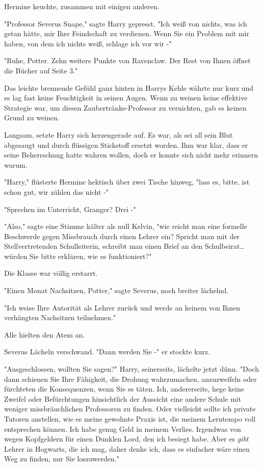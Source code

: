 {Hermine keuchte, zusammen mit einigen anderen.

"Professor Severus Snape," sagte Harry gepresst. "Ich weiß von nichts, was ich getan hätte, mir Ihre Feindschaft zu verdienen. Wenn Sie ein Problem mit mir haben, von dem ich nichts weiß, schlage ich vor wir -"

"Ruhe, Potter. Zehn weitere Punkte von Ravenclaw. Der Rest von Ihnen öffnet die Bücher auf Seite 3."

Das leichte brennende Gefühl ganz hinten in Harrys Kehle währte nur kurz und es lag fast keine Feuchtigkeit in seinen Augen. Wenn zu weinen keine effektive Strategie war, um diesen Zaubertränke-Professor zu vernichten, gab es keinen Grund zu weinen.

Langsam, setzte Harry sich kerzengerade auf. Es war, als sei all sein Blut abgesaugt und durch flüssigen Stickstoff ersetzt worden. Ihm war klar, dass er seine Beherrschung hatte wahren wollen, doch er konnte sich nicht mehr erinnern warum.

"Harry," flüsterte Hermine hektisch über zwei Tische hinweg, "lass es, bitte, ist schon gut, wir zählen das nicht -"

"Sprechen im Unterricht, Granger? Drei -"

"Also," sagte eine Stimme kälter als null Kelvin, "wie reicht man eine formelle Beschwerde gegen Missbrauch durch einen Lehrer ein? Spricht man mit der Stellvertretenden Schulleiterin, schreibt man einen Brief an den Schulbeirat… würden Sie bitte erklären, wie es funktioniert?"

Die Klasse war völlig erstarrt.

"Einen Monat Nachsitzen, Potter," sagte Severus, noch breiter lächelnd.

"Ich weise Ihre Autorität als Lehrer zurück und werde an keinem von Ihnen verhängten Nachsitzen teilnehmen."

Alle hielten den Atem an.

Severus Lächeln verschwand. "Dann werden Sie -" er stockte kurz.

"Ausgeschlossen, wollten Sie sagen?" Harry, seinerseits, lächelte jetzt dünn. "Doch dann schienen Sie Ihre Fähigkeit, die Drohung wahrzumachen, anzuzweifeln oder fürchteten die Konsequenzen, wenn Sie es täten. Ich, andererseits, hege keine Zweifel oder Befürchtungen hinsichtlich der Aussicht eine andere Schule mit weniger missbräuchlichen Professoren zu finden. Oder vielleicht sollte ich private Tutoren anstellen, wie es meine gewohnte Praxis ist, die meinem Lerntempo voll entsprechen können. Ich habe genug Geld in meinem Verlies. Irgendwas von wegen Kopfgeldern für einen Dunklen Lord, den ich besiegt habe. Aber es \emph{gibt} Lehrer in Hogwarts, die ich mag, daher denke ich, dass es einfacher wäre einen Weg zu finden, nur Sie loszuwerden."

}

